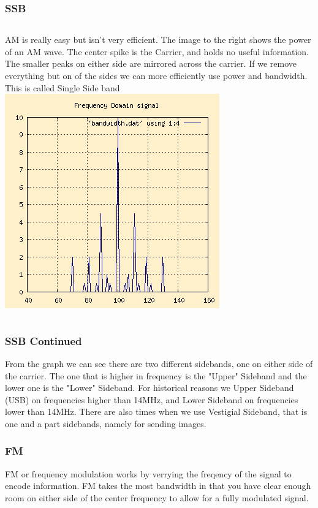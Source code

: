 \documentclass[10pt]{beamer}
\begin{document}
\begin{frame}
\frametitle{SSB }
\begin{columns}
AM is really easy but isn't very efficient. The image to the right shows the power of an AM wave. The center spike is the Carrier, and holds no useful information. The smaller peaks on either side are mirrored across the carrier. If we remove everything but on of the sides we can more efficiently use power and bandwidth. This is called Single Side band
\includegraphics[width=\textwidth]{amfft.png}
\end{columns}
\end{frame}

\begin{frame}
\frametitle{SSB Continued}
From the graph we can see there are two different sidebands, one on either side of the carrier. The one that is higher in frequency is the "Upper" Sideband and the lower one is the "Lower" Sideband. For historical reasons we Upper Sideband (USB) on frequencies higher than 14MHz, and Lower Sideband on frequencies lower than 14MHz. There are also times when we use Vestigial Sideband, that is one and a part sidebands, namely for sending images.
\end{frame}

\begin{frame}
\frametitle{FM}
FM or frequency modulation works by verrying the freqency of the signal to encode information. FM takes the most bandwidth in that you have clear enough room on either side of the center frequency to allow for a fully modulated signal.
\end{frame}
\end{document}
